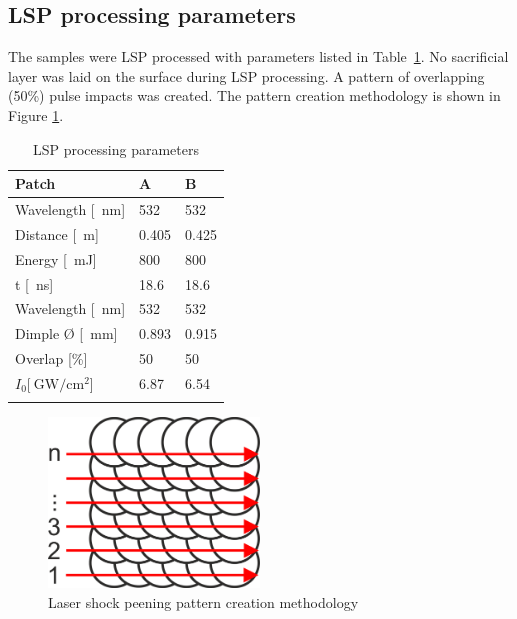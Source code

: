 \documentclass[sn-nature]{sn-jnl}%
\theoremstyle{thmstyleone}%
\theoremstyle{thmstyletwo}%
\theoremstyle{thmstylethree}%
\begin{document}

    \subsection{LSP processing parameters}

   The samples were LSP processed with parameters listed in Table~\ref{tab:lspparameters}. No sacrificial layer was laid on the surface during LSP processing. A  pattern of overlapping (50\%) pulse impacts was created. The pattern creation methodology is shown in Figure \ref{fig:pattern_creation}.

    \begin{table}[h!]
    \caption{LSP processing parameters}\label{tab:lspparameters}%
    \begin{tabular}{@{}lll@{}}
    \toprule
    Patch & A & B  \\
    \midrule
    Wavelength [\SI{}{\nm}] & 532 & 532    \\
    Distance [\SI{}{\m}] & 0.405 & 0.425    \\
    Energy [\SI{}{\milli\joule}]& 800 & 800    \\
    t [\SI{}{\ns}] & 18.6 & 18.6    \\
    Wavelength [\SI{}{\nm}] & 532 & 532    \\
    Dimple Ø [\SI{}{ \mm}] & 0.893 & 0.915    \\
    Overlap [\%]  & 50 & 50    \\
    \( I_0  [\SI[]{}{\giga\watt/\cm^2} \)]  & 6.87 & 6.54 \\
    \botrule
    \end{tabular}
    \end{table}


    \begin{figure}[h!]     
    \centering
    \includegraphics[width=0.5\textwidth]{pattern_creation.png}
    \caption{Laser shock peening pattern creation methodology}
    \label{fig:pattern_creation}
    \end{figure}
    
\end{document}
